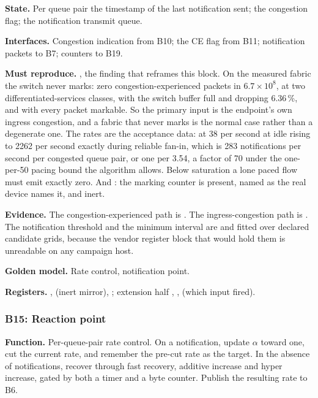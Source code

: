 \textbf{State.} Per queue pair the timestamp of the last notification sent; the
congestion flag; the notification transmit queue.

\textbf{Interfaces.} Congestion indication from B10; the CE flag from B11;
notification packets to B7; counters to B19.

\textbf{Must reproduce.} , the finding that reframes this block. On the
measured fabric the switch never marks: zero congestion-experienced packets in
$6.7 \times 10^{8}$, at two differentiated-services classes, with the switch
buffer full and dropping 6.36\,\%, and with every packet markable. So the
primary input is the endpoint's own ingress congestion, and a fabric that never
marks is the normal case rather than a degenerate one. The rates are the
acceptance data:  at 38 per second at idle rising to 2262
per second exactly during reliable fan-in, which is 283 notifications per
second per congested queue pair, or one per 3.54\mS{}, a factor of 70 under the
one-per-50\uS{} pacing bound the algorithm allows. Below saturation a lone
paced flow must emit exactly zero. And : the marking counter is
present, named as the real device names it, and inert.

\textbf{Evidence.} The congestion-experienced path is \evdoc{}. The
ingress-congestion path is \evcal{}. The notification threshold and the minimum
interval are \evcal{} and fitted over declared candidate grids, because the
vendor register block that would hold them is unreadable on any campaign host.

\textbf{Golden model.} Rate control, notification point.

{\raggedright
\textbf{Registers.} ,
 (inert mirror),
; extension half ,
,  (which input fired).\par}

\subsubsection{B15: Reaction point}

\textbf{Function.} Per-queue-pair rate control. On a notification, update
$\alpha$ toward one, cut the current rate, and remember the pre-cut rate as the
target. In the absence of notifications, recover through fast recovery,
additive increase and hyper increase, gated by both a timer and a byte counter.
Publish the resulting rate to B6.

